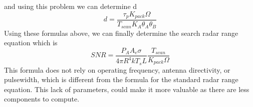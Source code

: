 \documentclass[12pt]{article}
\begin{document}
and using this problem we can determine d
\begin{equation}
    d = \frac{\tau_p K_{pack} \Omega  }{T_{scan} K_A \theta_A \theta_B}
\end{equation}
Using these formulas above, we can finally determine the search radar range equation which is 
\begin{equation}
    SNR = \frac{ P_A A_e \sigma }{ 4 \pi R^4 k T_s L} \frac{T_{scan}}{K_{pack} \Omega  }
\end{equation}
This formula does not rely on operating frequency, antenna directivity, or pulsewidth, which is different from the formula for the standard radar range equation. This lack of parameters, could make it more valuable as there are less components to compute.

\end{document}
